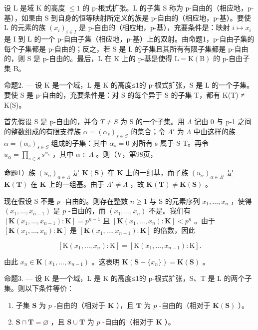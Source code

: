 设 L 是域 K 的高度 \(\leqslant1\) 的 p-根式扩张。L 的子集 S 称为 p-自由的（相应地，p-基），如果由 S 到自身的恒等映射所定义的族是 p-自由的（相应地，p-基）。要使 L 的元素的族 \((x_{i})_{i\in I}\) 是 p-自由的（相应地，p-基），充要条件是：映射 \(i\mapsto x_{i}\) 是 I 到 L 的一个 p-自由子集（相应地，p-基）上的双射。由命题1，p-自由子集的每个子集都是 p-自由的；反之，若 S 是 L 的子集且其所有有限子集都是 p-自由的，则 S 是 p-自由的。最后，L 在 K 上的 p-基是使得 \(\mathrm{L}=\mathrm{K}(\mathrm{B})\) 的 p-自由子集 B。

命题2. --- 设 K 是一个域，L 是 K 的高度≤1的 p-根式扩张，S 是 L 的一个子集。要使 S 是 p-自由的，充要条件是：对 S 的每个异于 S 的子集 T，都有 K(T) ≠ K(S)。

首先假设 S 是 p-自由的，并令 \(T \neq S\) 为 S 的一个子集。用 \(\Lambda\) 记由 0 与 p-1 之间的整数组成的有限支撑族 \(\alpha = (\alpha_{s})_{s \in S}\) 的集合；令 \(\Lambda'\) 为 \(\Lambda\) 中由这样的族 \(\alpha = (\alpha_{s})_{s \in S}\) 组成的子集：其中 \(\alpha_{s} = 0\) 对所有 s 属于 S-T。再令 \(u_{\alpha} = \prod_{s \in S} s^{\alpha_{s}}\) ，其中 \(\alpha \in \Lambda\) 。则（V，第98页，

命题1）族 \((u_{\alpha})_{\alpha \in \Lambda}\) 是 \(\mathbf{K}(\mathbf{S})\) 在 \(\mathbf{K}\) 上的一组基，而子族 \((u_{\alpha})_{\alpha \in \Lambda'}\) 是 \(\mathbf{K}(\mathbf{T})\) 在 \(\mathbf{K}\) 上的一组基。由于 \(\Lambda' \neq \Lambda\) ，故 \(\mathbf{K}(\mathbf{T}) \neq \mathbf{K}(\mathbf{S})\) 。

现在假设 S 不是 \(p\) -自由的。则存在整数 \(n \geqslant 1\) 与 S 的元素序列 \(x_1, \ldots, x_n\) ，使得 \((x_1, \ldots, x_{n-1})\) 是 \(p\) -自由的，而 \((x_1, \ldots, x_n)\) 不是。我们有 \([\mathbf{K}(x_1, \ldots, x_{n-1}) : \mathbf{K}] = p^{n-1}\) 且 \([\mathbf{K}(x_1, \ldots, x_n) : \mathbf{K}] < p^n\) 。由于 \([\mathbf{K}(x_1, \ldots, x_n) : \mathbf{K}]\) 是 \([\mathbf{K}(x_1, \ldots, x_{n-1}) : \mathbf{K}]\) 的倍数，因此

\[
[ \mathrm{K} (x _ {1}, \dots , x _ {n}): \mathrm{K} ] = [ \mathrm{K} (x _ {1}, \dots , x _ {n - 1}): \mathrm{K} ].
\]

由此 \(x_{n} \in \mathbf{K}(x_{1}, \ldots, x_{n-1})\) 。这表明 \(\mathbf{K}(\mathbf{S} - \{x_{n}\}) = \mathbf{K}(\mathbf{S})\) 。

命题3. --- 设 K 是一个域，L 是 K 的高度≤1的 p-根式扩张，S、T 是 L 的两个子集。则以下条件等价：

\begin{enumerate}
\def\labelenumi{\alph{enumi})}
\item
  子集 \(\mathbf{S}\) 为 \(p\) -自由的（相对于 \(\mathbf{K}\) ），且 \(\mathbf{T}\) 为 \(p\) -自由的（相对于 \(\mathbf{K}(\mathbf{S})\) ）。
\item
  \(\mathbf{S} \cap \mathbf{T} = \varnothing\) ，且 \(\mathbf{S} \cup \mathbf{T}\) 为 \(p\) -自由的（相对于 \(\mathbf{K}\) ）。
\end{enumerate}

